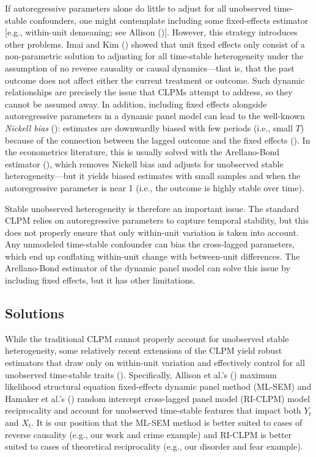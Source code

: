 \documentclass[
  letterpaper,
  DIV=11,
  numbers=noendperiod]{scrartcl}
\begin{document}
If autoregressive parameters alone do little to adjust for all
unobserved time-stable confounders, one might contemplate including some
fixed-effects estimator {[}e.g., within-unit demeaning; see Allison
(){]}. However, this strategy
introduces other problems. Imai and Kim
() showed that unit fixed effects
only consist of a non-parametric solution to adjusting for all
time-stable heterogeneity under the assumption of no reverse causality
or causal dynamics---that is, that the past outcome does not affect
either the current treatment or outcome. Such dynamic relationships are
precisely the issue that CLPMs attempt to address, so they cannot be
assumed away. In addition, including fixed effects alongside
autoregressive parameters in a dynamic panel model can lead to the
well-known \emph{Nickell bias} (): estimates are downwardly biased with few periods (i.e., small
\(T\)) because of the connection between the lagged outcome and the
fixed effects (). In the econometrics literature, this is usually solved with the
Arellano-Bond estimator (), which removes Nickell bias and adjusts for unobserved
stable heterogeneity---but it yields biased estimates with small samples
and when the autoregressive parameter is near 1 (i.e., the outcome is
highly stable over time).

Stable unobserved heterogeneity is therefore an important issue. The
standard CLPM relies on autoregressive parameters to capture temporal
stability, but this does not properly ensure that only within-unit
variation is taken into account. Any unmodeled time-stable confounder
can bias the cross-lagged parameters, which end up conflating
within-unit change with between-unit differences. The Arellano-Bond
estimator of the dynamic panel model can solve this issue by including
fixed effects, but it has other limitations.

\subsection{Solutions}\label{solutions}

While the traditional CLPM cannot properly account for unobserved stable
heterogeneity, some relatively recent extensions of the CLPM yield
robust estimators that draw only on within-unit variation and
effectively control for all unobserved time-stable traits
().
Specifically, Allison et al.'s ()
maximum likelihood structural equation fixed-effects dynamic panel
method (ML-SEM) and Hamaker et al.'s
() random intercept cross-lagged
panel model (RI-CLPM) model reciprocality and account for unobserved
time-stable features that impact both \(Y_t\) and \(X_t\). It is our
position that the ML-SEM method is better suited to cases of reverse
causality (e.g., our work and crime example) and RI-CLPM is better
suited to cases of theoretical reciprocality (e.g., our disorder and
fear example).
\end{document}
